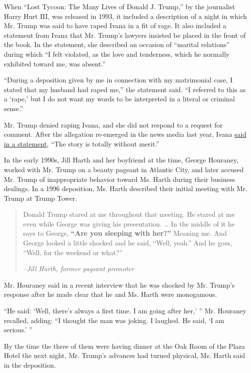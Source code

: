 When ``Lost Tycoon: The Many Lives of Donald J. Trump,'' by the
journalist Harry Hurt III, was released in 1993, it included a
description of a night in which Mr. Trump was said to have raped Ivana
in a fit of rage. It also included a statement from Ivana that Mr.
Trump's lawyers insisted be placed in the front of the book. In the
statement, she described an occasion of ``marital relations'' during
which ``I felt violated, as the love and tenderness, which he normally
exhibited toward me, was absent.''

``During a deposition given by me in connection with my matrimonial
case, I stated that my husband had raped me,'' the statement said. ``I
referred to this as a `rape,' but I do not want my words to be
interpreted in a literal or criminal sense.''

Mr. Trump denied raping Ivana, and she did not respond to a request for
comment. After the allegation re-emerged in the news media last year,
Ivana
\href{http://www.nytimes.com/politics/first-draft/2015/07/28/donald-trump-aide-apologizes-for-saying-you-cant-rape-your-spouse/}{said
in a statement}, ``The story is totally without merit.''

In the early 1990s, Jill Harth and her boyfriend at the time, George
Houraney, worked with Mr. Trump on a beauty pageant in Atlantic City,
and later accused Mr. Trump of inappropriate behavior toward Ms. Harth
during their business dealings. In a 1996 deposition, Ms. Harth
described their initial meeting with Mr. Trump at Trump Tower.

\begin{quote}
Donald Trump stared at me throughout that meeting. He stared at me even
while George was giving his presentation. \ldots{} In the middle of it
he says to George, \textbf{``Are you sleeping with her?''} Meaning me.
And George looked a little shocked and he said, ``Well, yeah.'' And he
goes, ``Well, for the weekend or what?''

\emph{--Jill Harth, former pageant promoter}
\end{quote}

Mr. Houraney said in a recent interview that he was shocked by Mr.
Trump's response after he made clear that he and Ms. Harth were
monogamous.

``He said: `Well, there's always a first time. I am going after her,' ''
Mr. Houraney recalled, adding: ``I thought the man was joking. I
laughed. He said, `I am serious.' ''

By the time the three of them were having dinner at the Oak Room of the
Plaza Hotel the next night, Mr. Trump's advances had turned physical,
Ms. Harth said in the deposition.


